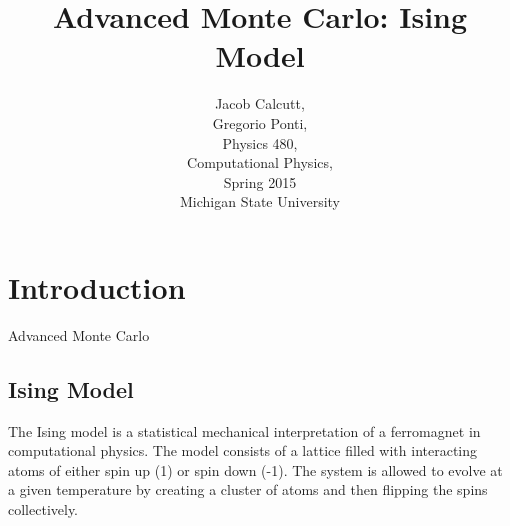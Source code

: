 \documentclass[letterpaper,12pt]{article}
\numberwithin{equation}{subsection}
\begin{document}
\title{\textbf{Advanced Monte Carlo: Ising Model}}
\author{Jacob Calcutt,\\
	Gregorio Ponti,\\
	Physics 480, \\
	Computational Physics,\\
	Spring 2015\\
	Michigan State University}
\maketitle

\newpage
\tableofcontents

\newpage
\section{Introduction}
Advanced Monte Carlo
\subsection{Ising Model}
The Ising model is a statistical mechanical interpretation of a ferromagnet in computational physics. The model consists of a lattice filled with interacting atoms of either spin up (1) or spin down (-1). The system is allowed to evolve at a given temperature by creating a cluster of atoms and then flipping the spins collectively.
\end{document}
